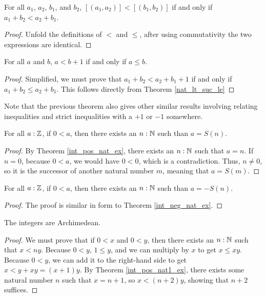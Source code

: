 \documentclass[../../math.tex]{subfiles}
\begin{document}
\begin{theorem}
    For all $a_1$, $a_2$, $b_1$, and $b_2$, $[(a_1, a_2)] < [(b_1, b_2)]$ if and
    only if $a_1 + b_2 < a_2 + b_1$.
\end{theorem}
\begin{proof}
    Unfold the definitions of $<$ and $\leq$, after using commutativity the two
    expressions are identical.
\end{proof}

\begin{theorem} \label{int_lt_suc_le} \label{int_le_suc_lt}
        \label{int_le_pre_lt} \label{int_lt_pre_le}
    For all $a$ and $b$, $a < b + 1$ if and only if $a \leq b$.
\end{theorem}
\begin{proof}
    Simplified, we must prove that $a_1 + b_2 < a_2 + b_1 + 1$ if and only if
    $a_1 + b_2 \leq a_2 + b_1$.  This follows directly from Theorem
    \ref{nat_lt_suc_le}
\end{proof}

Note that the previous theorem also gives other similar results involving
relating inequalities and strict inequalities with a $+ 1$ or $-1$ somewhere.

\begin{theorem} \label{int_pos_nat1_ex}
    For all $a : \mathbb{Z}$, if $0 < a$, then there exists an $n : \mathbb{N}$ such than $a =
    S(n)$.
\end{theorem}
\begin{proof}
    By Theorem \ref{int_pos_nat_ex}, there exists an $n : \mathbb{N}$ such that $a = n$.
    If $n = 0$, because $0 < a$, we would have $0 < 0$, which is a
    contradiction.  Thus, $n \neq 0$, so it is the successor of another natural
    number $m$, meaning that $a = S(m)$.
\end{proof}

\begin{theorem} \label{int_neg_nat1_ex}
    For all $a : \mathbb{Z}$, if $0 < a$, then there exists an $n : \mathbb{N}$ such than $a =
    -S(n)$.
\end{theorem}
\begin{proof}
    The proof is similar in form to Theorem \ref{int_neg_nat_ex}.
\end{proof}

\begin{instance}
    The integers are Archimedean.
\end{instance}
\begin{proof}
    We must prove that if $0 < x$ and $0 < y$, then there exists an $n : \mathbb{N}$
    such that $x < ny$.  Because $0 < y$, $1 \leq y$, and we can multiply by $x$
    to get $x \leq xy$.  Because $0 < y$, we can add it to the right-hand side
    to get $x < y + xy = (x + 1)y$.  By Theorem \ref{int_pos_nat1_ex}, there
    exists some natural number $n$ such that $x = n + 1$, so $x < (n + 2)y$,
    showing that $n + 2$ suffices.
\end{proof}
\end{document}
